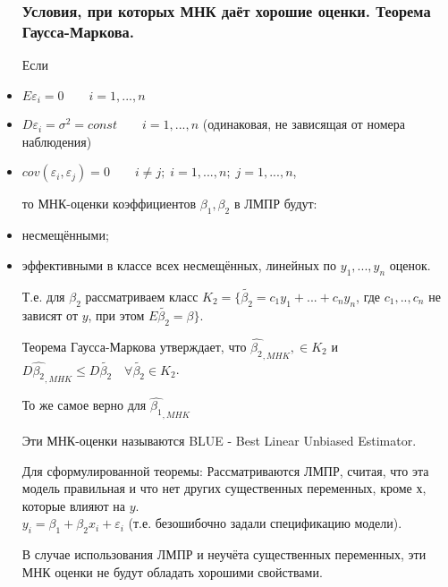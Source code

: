 \documentclass{article}
\begin{document}
\begin{itemize}
\subsubsection{Условия, при которых МНК даёт хорошие оценки. Теорема Гаусса-Маркова.}
Если
\item $E\varepsilon_i=0 \qquad i=1,...,n$             \item $D\varepsilon_i=\sigma^2=const \qquad i=1,...,n$ (одинаковая, не зависящая от номера наблюдения)
\item $cov(\varepsilon_i,\varepsilon_j)=0 \qquad i\neq j;\; i=1,...,n;\; j=1,...,n$,

то МНК-оценки коэффициентов $\beta_1, \beta_2$ в ЛМПР будут:
\item несмещёнными;
\item эффективными в классе всех несмещённых, линейных по $y_1,...,y_n$ оценок.

\vspace{4ex}
Т.е. для $\beta_2$ рассматриваем класс $K_2=\{\widetilde{\beta_2}=c_1y_1+...+c_ny_n$, где $c_1,..,c_n$ не зависят от $y$, при этом $E\widetilde{\beta_2}=\beta\}$.

Теорема Гаусса-Маркова утверждает, что $\hat{\beta_2}_{,MHK},\in K_2$ и $D\hat{\beta_2}_{,MHK}\leq D\widetilde{\beta_2} \quad \forall \widetilde{\beta_2} \in K_2$.

То же самое верно для $\hat{\beta_1}_{,MHK}$

Эти МНК-оценки называются BLUE - Best Linear Unbiased Estimator.

Для сформулированной теоремы: Рассматриваются ЛМПР, считая, что эта модель правильная и что нет других существенных переменных, кроме $х$, которые влияют на $y$. \\ $y_i=\beta_1+\beta_2x_i+\varepsilon_i$
(т.е. безошибочно задали спецификацию модели).

В случае использования ЛМПР и неучёта существенных переменных, эти МНК оценки не будут обладать хорошими свойствами.


\end{itemize}
\end{document}
